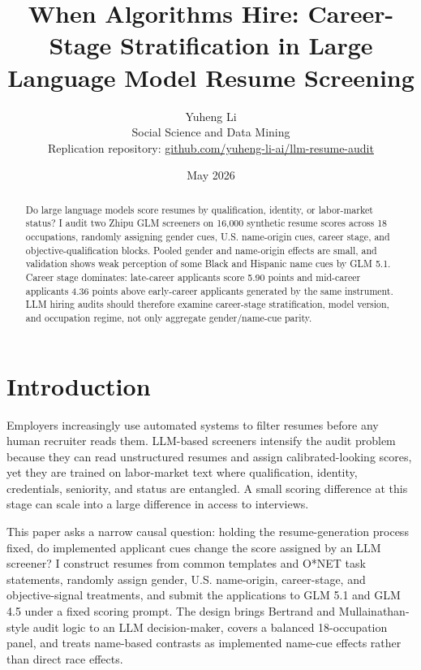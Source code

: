 \documentclass[10pt,twocolumn,letterpaper]{article}
\title{\vspace{-1.4em}\textbf{When Algorithms Hire: Career-Stage Stratification in Large Language Model Resume Screening}}
\author{Yuheng Li\\Social Science and Data Mining\\
\small Replication repository: \href{https://github.com/yuheng-li-ai/llm-resume-audit}{github.com/yuheng-li-ai/llm-resume-audit}}
\date{\vspace{-0.8em}May 2026}
\begin{document}
\maketitle

\begin{abstract}
Do large language models score resumes by qualification, identity, or labor-market status? I audit two Zhipu GLM screeners on 16,000 synthetic resume scores across 18 occupations, randomly assigning gender cues, U.S. name-origin cues, career stage, and objective-qualification blocks. Pooled gender and name-origin effects are small, and validation shows weak perception of some Black and Hispanic name cues by GLM 5.1. Career stage dominates: late-career applicants score 5.90 points and mid-career applicants 4.36 points above early-career applicants generated by the same instrument. LLM hiring audits should therefore examine career-stage stratification, model version, and occupation regime, not only aggregate gender/name-cue parity.
\end{abstract}

\section{Introduction}

Employers increasingly use automated systems to filter resumes before any human recruiter reads them. LLM-based screeners intensify the audit problem because they can read unstructured resumes and assign calibrated-looking scores, yet they are trained on labor-market text where qualification, identity, credentials, seniority, and status are entangled. A small scoring difference at this stage can scale into a large difference in access to interviews.

This paper asks a narrow causal question: holding the resume-generation process fixed, do implemented applicant cues change the score assigned by an LLM screener? I construct resumes from common templates and O*NET task statements, randomly assign gender, U.S. name-origin, career-stage, and objective-signal treatments, and submit the applications to GLM 5.1 and GLM 4.5 under a fixed scoring prompt. The design brings Bertrand and Mullainathan-style audit logic to an LLM decision-maker, covers a balanced 18-occupation panel, and treats name-based contrasts as implemented name-cue effects rather than direct race effects.
\end{document}
